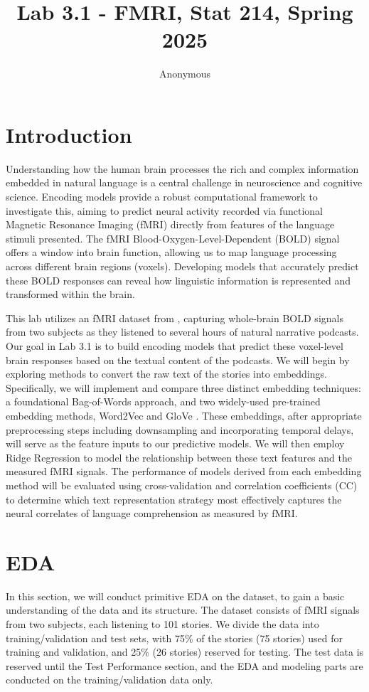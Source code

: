 \documentclass[10pt,letterpaper]{article}
\title{Lab 3.1 - FMRI, Stat 214, Spring 2025}
\author{Anonymous}
\begin{document}
\maketitle

\section{Introduction}
Understanding how the human brain processes the rich and complex information embedded in natural language is a central challenge in neuroscience and cognitive science. Encoding models provide a robust computational framework to investigate this, aiming to predict neural activity recorded via functional Magnetic Resonance Imaging (fMRI) directly from features of the language stimuli presented. The fMRI Blood-Oxygen-Level-Dependent (BOLD) signal offers a window into brain function, allowing us to map language processing across different brain regions (voxels). Developing models that accurately predict these BOLD responses can reveal how linguistic information is represented and transformed within the brain.

This lab utilizes an fMRI dataset from \cite{jain2018incorporating}, capturing whole-brain BOLD signals from two subjects as they listened to several hours of natural narrative podcasts. Our goal in Lab 3.1 is to build encoding models that predict these voxel-level brain responses based on the textual content of the podcasts. We will begin by exploring methods to convert the raw text of the stories into embeddings. Specifically, we will implement and compare three distinct embedding techniques: a foundational Bag-of-Words approach, and two widely-used pre-trained embedding methods, Word2Vec \cite{mikolov2013efficient} and GloVe \cite{pennington2014glove}. These embeddings, after appropriate preprocessing steps including downsampling and incorporating temporal delays, will serve as the feature inputs to our predictive models. We will then employ Ridge Regression to model the relationship between these text features and the measured fMRI signals. The performance of models derived from each embedding method will be evaluated using cross-validation and correlation coefficients (CC) to determine which text representation strategy most effectively captures the neural correlates of language comprehension as measured by fMRI.

\section{EDA}
In this section, we will conduct primitive EDA on the dataset, to gain a basic understanding of the data and its structure. The dataset consists of fMRI signals from two subjects, each listening to 101 stories. We divide the data into training/validation and test sets, with 75\% of the stories (75 stories) used for training and validation, and 25\% (26 stories) reserved for testing. The test data is reserved until the Test Performance section, and the EDA and modeling parts are conducted on the training/validation data only. 
\end{document}

